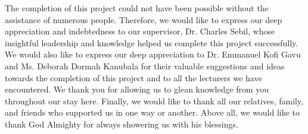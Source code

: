 The completion of this project could not have been possible without the assistance of numerous people. Therefore, we would like to express our deep appreciation and indebtedness to our supervisor, Dr. Charles Sebil, whose insightful leadership and knowledge helped us complete this project successfully. \newline
We would also like to express our deep appreciation to Dr. Emmanuel Kofi Gavu and Ms. Deborah Dormah Kanubala for their valuable suggestions and ideas towards the completion of this project and to all the lecturers we have encountered. We thank you for allowing us to glean knowledge from you throughout our stay here. \newline
Finally, we would like to thank all our relatives, family, and friends who supported us in one way or another. Above all, we would like to thank God Almighty for always showering us with his blessings.